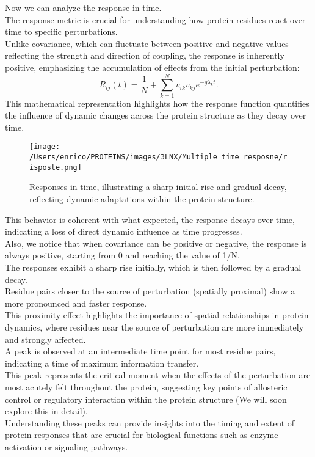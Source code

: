 \documentclass[English, Lau, oneside]{sapthesis}
\begin{document}
\newpage
Now we can analyze the response in time.\\
The response metric is crucial for understanding how protein residues react over time to specific perturbations.\\
Unlike covariance, which can fluctuate between positive and negative values reflecting the strength and direction of coupling, the response is inherently positive, emphasizing the accumulation of effects from the initial perturbation:
\[
R_{ij}(t) = \frac{1}{N}+{\sum_{k=1}^N  v_{ik} v_{kj} e^{-g \lambda_k t}}.
\]
This mathematical representation highlights how the response function quantifies the influence of dynamic changes across the protein structure as they decay over time.
\begin{figure}[h!]
    \centering
    \texttt{[image: /Users/enrico/PROTEINS/images/3LNX/Multiple\_time\_resposne/risposte.png]}    
    \caption{Responses in time, illustrating a sharp initial rise and gradual decay, reflecting dynamic adaptations within the protein structure.}
\end{figure}
This behavior is coherent with what expected, the response decays over time, indicating a loss of direct dynamic influence as time progresses. \\
Also, we notice that when covariance can be positive or negative, the response is always positive, starting from 0 and reaching the value of 1/N.\\
The responses exhibit a sharp rise initially, which is then followed by a gradual decay.\\
Residue pairs closer to the source of perturbation (spatially proximal) show a more pronounced and faster response.\\
This proximity effect highlights the importance of spatial relationships in protein dynamics, where residues near the source of perturbation are more immediately and strongly affected.\\
A peak is observed at an intermediate time point for most residue pairs, indicating a time of maximum information transfer.\\
This peak represents the critical moment when the effects of the perturbation are most acutely felt throughout the protein, suggesting key points of allosteric control or regulatory interaction within the protein structure (We will soon explore this in detail).\\
Understanding these peaks can provide insights into the timing and extent of protein responses that are crucial for biological functions such as enzyme activation or signaling pathways.\\
        
\end{document}
